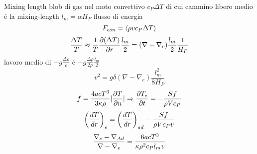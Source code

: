 \begin{frame}{Mixing length}
blob di gas nel moto convettivo $c_P\Delta T$ di cui cammino libero medio \'e la mixing-length $l_m=\alpha H_P$
flusso di energia
\begin{equation}
F_{con}=\exv{\rho vc_P\Delta T}\label{eq:convectiveflux}
\end{equation}
\begin{equation}
\frac{\Delta T}{T}\approx\frac{1}{T}\PDy{r}{(\Delta T)}\frac{l_m}{2}=(\nabla-\nabla_e)\frac{l_m}{2}\frac{1}{H_P}
\end{equation}
lavoro medio di $-g\frac{\Delta\rho}{\rho}$ \'e $-g\frac{\Delta\rho}{2\rho}\frac{l_m}{2}$
\begin{equation}
v^2=g\delta(\nabla-\nabla_e)\frac{l_m^2}{8H_P}\label{eq:blobvelocity}
\end{equation}
\begin{equation}%
f=\frac{4acT^3}{3\kappa\rho}|\PDy{n}{T}|\Rightarrow \PDy{t}{T_e}=-\frac{Sf}{\rho Vc_P}
\end{equation}
\begin{equation}
\Dcvar{\TDy{r}{T}}{e}=\Dcvar{\TDy{r}{T}}{ad}-\frac{Sf}{\rho Vc_Pv}\label{eq:Tchangelength}
\end{equation}
\begin{equation}
\frac{\nabla_e-\nad{}}{\nabla-\nabla_e}=\frac{6acT^3}{\kappa\rho^2c_Pl_mv}
\end{equation}

\end{frame}

